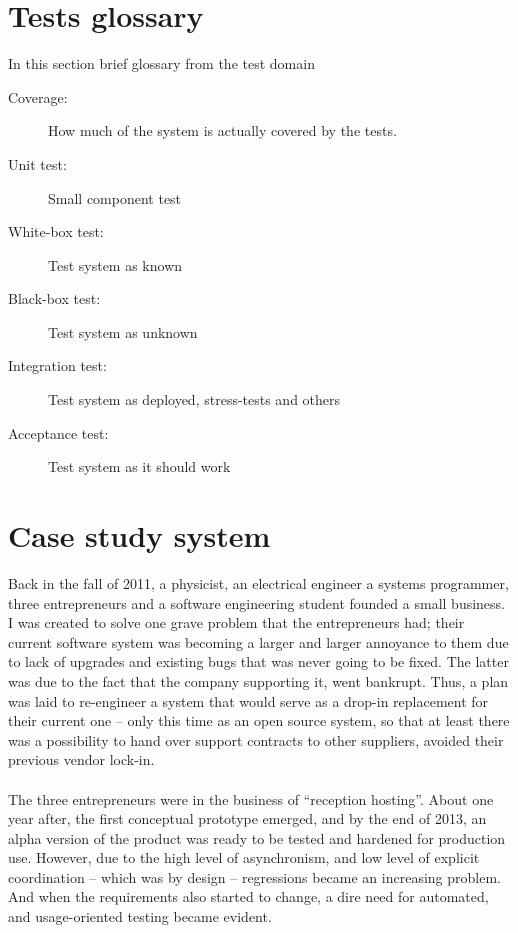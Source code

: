 \section{Tests glossary}
In this section brief glossary from the test domain
\begin{description}
  \item[Coverage:] How much of the system is actually covered by the tests.
  \item[Unit test:] Small component test
  \item[White-box test:] Test system as known
  \item[Black-box test:] Test system as unknown
  \item[Integration test:] Test system as deployed, stress-tests and others
  \item[Acceptance test:] Test system as it should work
\end{description}

\section{Case study system}
Back in the fall of 2011, a physicist, an electrical engineer a systems programmer, three entrepreneurs and a software engineering student founded a small business. I was created to solve one grave problem that the entrepreneurs had; their current software system was becoming a larger and larger annoyance to them due to lack of upgrades and existing bugs that was never going to be fixed. The latter was due to the fact that the company supporting it, went bankrupt. Thus, a plan was laid to re-engineer a system that would serve as a drop-in replacement for their current one -- only this time as an open source system, so that at least there was a possibility to hand over support contracts to other suppliers, avoided their previous vendor lock-in.\\\\
The three entrepreneurs were in the business of ``reception hosting''. About one year after, the first conceptual prototype emerged, and by the end of 2013, an alpha version of the product was ready to be tested and hardened for production use. However, due to the high level of asynchronism, and low level of explicit coordination -- which was by design -- regressions became an increasing problem. And when the requirements also started to change, a dire need for automated, and usage-oriented testing became evident.


